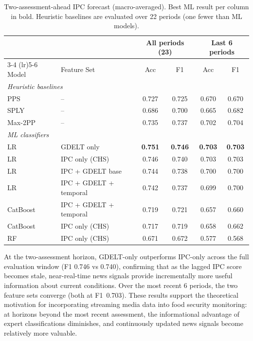 \documentclass{article}
\begin{document}
\begin{table}[H]
\centering
\small
\caption{Two-assessment-ahead IPC forecast (macro-averaged). Best ML result per column in bold. Heuristic baselines are evaluated over 22 periods (one fewer than ML models).}
\label{tab:longer_horizon}
\begin{tabular}{ll cccc}
\toprule
& & \multicolumn{2}{c}{All periods (23)} & \multicolumn{2}{c}{Last 6 periods} \\
\cmidrule(lr){3-4} \cmidrule(lr){5-6}
Model & Feature Set & Acc & F1 & Acc & F1 \\
\midrule
\multicolumn{6}{l}{\textit{Heuristic baselines}} \\
PPS & -- & 0.727 & 0.725 & 0.670 & 0.670 \\
SPLY & -- & 0.686 & 0.700 & 0.665 & 0.682 \\
Max-2PP & -- & 0.735 & 0.737 & 0.702 & 0.704 \\
\midrule
\multicolumn{6}{l}{\textit{ML classifiers}} \\
LR & GDELT only & \textbf{0.751} & \textbf{0.746} & \textbf{0.703} & \textbf{0.703} \\
LR & IPC only (CHS) & 0.746 & 0.740 & 0.703 & 0.703 \\
LR & IPC + GDELT base & 0.744 & 0.738 & 0.700 & 0.700 \\
LR & IPC + GDELT + temporal & 0.742 & 0.737 & 0.699 & 0.700 \\
CatBoost & IPC + GDELT + temporal & 0.719 & 0.721 & 0.657 & 0.660 \\
CatBoost & IPC only (CHS) & 0.717 & 0.719 & 0.658 & 0.662 \\
RF & IPC only (CHS) & 0.671 & 0.672 & 0.577 & 0.568 \\
\bottomrule
\end{tabular}
\end{table}

At the two-assessment horizon, GDELT-only outperforms IPC-only across the full evaluation window (F1 0.746 vs 0.740), confirming that as the lagged IPC score becomes stale, near-real-time news signals provide incrementally more useful information about current conditions. Over the most recent 6 periods, the two feature sets converge (both at F1~0.703). These results support the theoretical motivation for incorporating streaming media data into food security monitoring: at horizons beyond the most recent assessment, the informational advantage of expert classifications diminishes, and continuously updated news signals become relatively more valuable.
\end{document}
